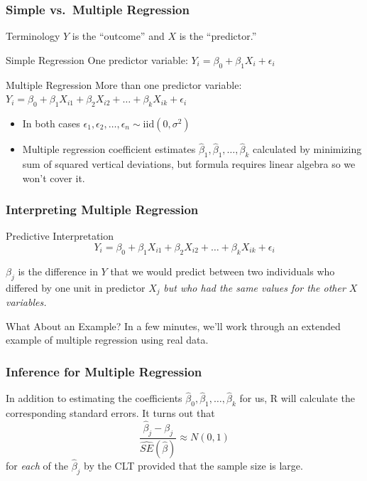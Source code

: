\begin{frame}
\frametitle{Simple vs.\ Multiple Regression}
\begin{block}{Terminology}
$Y$ is the ``outcome'' and $X$ is the ``predictor.''
\end{block}

\begin{block}{Simple Regression}
One predictor variable: $Y_i = \beta_0 + \beta_1 X_i + \epsilon_i$
\end{block}
\begin{block}{Multiple Regression}
More than one predictor variable: $Y_i = \beta_0 + \beta_1 X_{i1} + \beta_2 X_{i2} +  \hdots + \beta_k X_{ik} + \epsilon_i$
\end{block}


\begin{itemize}
	\item In both cases $\epsilon_1, \epsilon_2, \hdots, \epsilon_n \sim \mbox{iid} (0,\sigma^2)$
	\item Multiple regression coefficient estimates $\widehat{\beta}_1, \widehat{\beta}_1, \hdots, \widehat{\beta}_k$ calculated by minimizing  sum of squared vertical deviations, but formula requires linear algebra so we won't cover it.
\end{itemize}
\end{frame}


\begin{frame}
\frametitle{Interpreting Multiple Regression}

\begin{block}{Predictive Interpretation}
$$Y_i = \beta_0 + \beta_1 X_{i1} + \beta_2 X_{i2} +  \hdots + \beta_k X_{ik} + \epsilon_i$$

$\beta_j$ is the difference in $Y$ that we would predict between two individuals who differed by one unit in predictor $X_j$ \emph{\alert{but who had the same values for the other $X$ variables.}} 

\end{block}

\begin{block}{What About an Example?}
	In a few minutes, we'll work through an extended example of multiple regression using real data.
\end{block}
\end{frame}

\begin{frame}
\frametitle{Inference for Multiple Regression}

In addition to estimating the coefficients $\widehat{\beta}_0, \widehat{\beta}_1, \hdots, \widehat{\beta}_k$ for us, R will calculate the corresponding standard errors. It turns out that
	$$\frac{\widehat{\beta}_j - \beta_j}{\widehat{SE}(\widehat{\beta})} \approx N(0,1)$$
for \emph{each} of the $\widehat{\beta}_j$ by the CLT provided that the sample size is large.

\end{frame}

